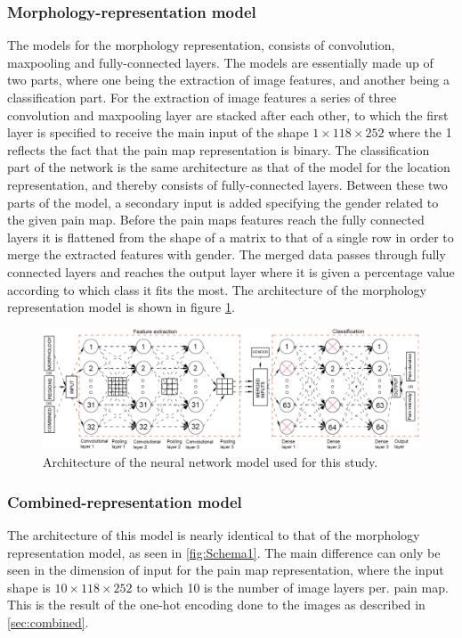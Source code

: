 \subsubsection{Morphology-representation model}
The models for the morphology representation, consists of convolution, maxpooling and fully-connected layers.  
The models are essentially made up of two parts, where one being the extraction of image features, and another being a classification part. 
For the extraction of image features a series of three convolution and maxpooling layer are stacked after each other, to which the first layer is specified to receive the main input of the shape $1 \times 118 \times 252$ where the 1 reflects the fact that the pain map representation is binary. 
The classification part of the network is the same architecture as that of the model for the location representation, and thereby consists of fully-connected layers. Between these two parts of the model, a secondary input is added specifying the gender related to the given pain map. 
Before the pain maps features reach the fully connected layers it is flattened from the shape of a matrix to that of a single row in order to merge the extracted features with gender. The merged data passes through fully connected layers and reaches the output layer where it is given a percentage value according to which class it fits the most. 
The architecture of the morphology representation model is shown in figure \ref{fig:Schema1}.

\begin{figure} [H]
\centering
\includegraphics[width=1.0\textwidth]{figures/Schema1}
\caption{Architecture of the neural network model used for this study.}
\label{fig:Schema1} 
\end{figure}



\subsubsection{Combined-representation model}
The architecture of this model is nearly identical to that of the morphology representation model, as seen in \autoref{fig:Schema1}. 
The main difference can only be seen in the dimension of input for the pain map representation, where the input shape is $10 \times 118 \times 252$ to which 10 is the number of image layers per. pain map. This is the result of the one-hot encoding done to the images as described in \ref{sec:combined}. 


